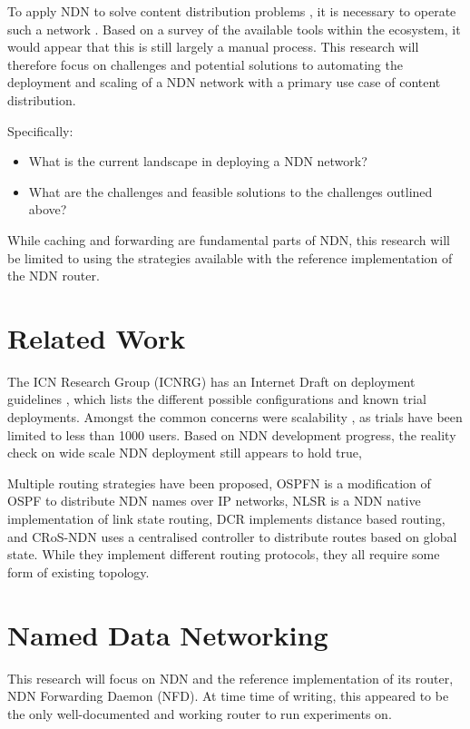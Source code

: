 \documentclass[conference]{IEEEtran}
\begin{document}
To apply NDN to solve content distribution problems \cite{ndnbigdata},
it is necessary to operate such a network \cite{ndntestbed}.
Based on a survey of the available tools within the ecosystem,
it would appear that this is still largely a manual process.
This research will therefore focus on challenges
and potential solutions to automating the deployment and
scaling of a NDN network with a primary use case of content distribution.

Specifically:

\begin{itemize}
    \item What is the current landscape in deploying a NDN network?
    \item What are the challenges and feasible solutions to the challenges outlined above?
\end{itemize}

While caching and forwarding are fundamental parts of NDN,
this research will be limited to using the strategies available
with the reference implementation of the NDN router.



\section*{Related Work}
The ICN Research Group (ICNRG) has an Internet Draft on deployment guidelines \cite{deployguide},
which lists the different possible configurations and known trial deployments.
Amongst the common concerns were scalability \cite{scalableoverview} \cite{scalablenote},
as trials have been limited to less than 1000 users.
Based on NDN development progress,
the reality check \cite{reality} on wide scale NDN deployment still appears to hold true,

Multiple routing strategies have been proposed,
OSPFN \cite{ospfn} is a modification of OSPF to distribute NDN names over IP networks,
NLSR  \cite{nlsr} is a NDN native implementation of link state routing,
DCR \cite{dcr} implements distance based routing,
and CRoS-NDN \cite{cros}  uses a centralised controller to distribute routes based on global state.
While they implement different routing protocols,
they all require some form of existing topology.



\section*{Named Data Networking}
This research will focus on NDN and the reference implementation of its router,
NDN Forwarding Daemon (NFD).
At time time of writing, this appeared to be the only well-documented and working
router to run experiments on.
\end{document}

